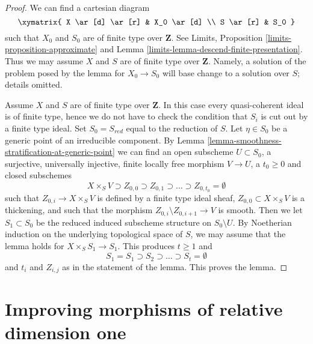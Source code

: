 \begin{proof}
We can find a cartesian diagram
$$
\xymatrix{
X \ar[d] \ar[r] & X_0 \ar[d] \\
S \ar[r] & S_0
}
$$
such that $X_0$ and $S_0$ are of finite type over $\mathbf{Z}$. See
Limits, Proposition \ref{limits-proposition-approximate} and
Lemma \ref{limits-lemma-descend-finite-presentation}.
Thus we may assume $X$ and $S$ are of finite type over $\mathbf{Z}$.
Namely, a solution of the problem posed by the lemma for $X_0 \to S_0$
will base change to a solution over $S$; details omitted.

\medskip\noindent
Assume $X$ and $S$ are of finite type over $\mathbf{Z}$.
In this case every quasi-coherent ideal is of finite type, hence
we do not have to check the condition that $S_i$ is cut out
by a finite type ideal. Set $S_0 = S_{red}$ equal to the reduction of $S$.
Let $\eta \in S_0$ be a generic point of an irreducible component.
By Lemma \ref{lemma-smoothness-stratification-at-generic-point}
we can find an open subscheme $U \subset S_0$, 
a surjective, universally injective, finite locally free
morphism $V \to U$, a $t_0 \geq 0$ and closed subschemes
$$
X \times_S V \supset Z_{0, 0} \supset Z_{0, 1} \supset \ldots \supset
Z_{0, t_0} = \emptyset
$$
such that $Z_{0, i} \to X \times_S V$ is defined by a finite type ideal sheaf,
$Z_{0, 0} \subset X \times_S V$ is a thickening, and such that the morphism
$Z_{0, i} \setminus Z_{0, i + 1} \to V$ is smooth.
Then we let $S_1 \subset S_0$ be the reduced induced subscheme structure
on $S_0 \setminus U$. By Noetherian induction on the underlying
topological space of $S$, we may assume that the lemma holds for
$X \times_S S_1 \to S_1$. This produces $t \geq 1$ and
$$
S_1 = S_1 \supset S_2 \supset \ldots \supset S_t = \emptyset
$$
and $t_i$ and $Z_{i, j}$ as in the statement of the lemma.
This proves the lemma.
\end{proof}


















\section{Improving morphisms of relative dimension one}
\label{section-make-good-curves}

